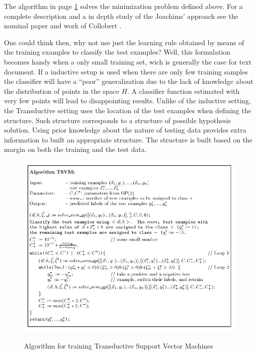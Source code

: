 The algorithm in page \ref{fig:alg-tsvm} solves the minimization problem defined above. For a complete description and a in depth study of the Joachims' approach see the nominal paper \cite{Joachims99c}
and work of Collobert \cite{1248609}.

One could think then, why not use just the learning rule obtained by means of the training examples to classify
the test examples? Well, this formulation becomes handy when a only small
training set, wich is generally the case for text document. If a inductive
setup is used when there are only few training samples the classifier will have a \textquotedblleft{}poor\textquotedblright{}
generalization due to the lack of knowledge about the distribution
of points in the space $H$. A classifier function estimated with very few points will lead to
disappointing results. Unlike of the inductive setting, the Transductive
setting uses the location of the test examples when defining the structure.
Such structure corresponds to a structure of possible hypothesis solution.
Using prior knowledge about the nature of testing data provides extra
information to built an appropriate structure. The structure is built
based on the margin on both the training and the test data.



\begin{figure}[H]
\begin{centering}
\includegraphics[scale=0.3]{images/joachims-algorithm}\label{fig:alg-tsvm}
\par\end{centering}
\caption{Algorithm for training Transductive Support Vector Machines \cite{Joachims99c}}
\end{figure}





